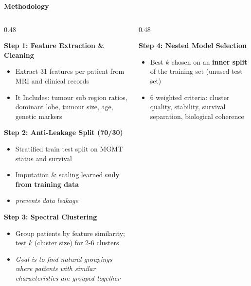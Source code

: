 \documentclass[aspectratio=169, 10pt]{beamer}
\begin{document}
\begin{frame}{\textbf{Methodology}}
\footnotesize

\begin{columns}[T]
\begin{column}{0.48\textwidth}

\textbf{Step 1: Feature Extraction \& Cleaning}
\begin{itemize}
    \item Extract 31 features per patient from MRI and clinical records
    \item It Includes: tumour sub region ratios, dominant lobe, tumour size, age, genetic markers
\end{itemize}
\vspace{0.1cm}

\textbf{Step 2: Anti-Leakage Split (70/30)}
\begin{itemize}
    \item Stratified train test split on MGMT status and survival
    \item Imputation \& scaling learned \textbf{only from training data}
    \item \textit{prevents data leakage}
\end{itemize}
\vspace{0.1cm}

\textbf{Step 3: Spectral Clustering}
\begin{itemize}
    \item Group patients by feature similarity; test $k$ (cluster size) for 2-6 clusters
    \item \textit{Goal is to find natural groupings where patients with similar characteristics are grouped together}
\end{itemize}

\end{column}
\begin{column}{0.48\textwidth}

\textbf{Step 4: Nested Model Selection}
\begin{itemize}
    \item Best $k$ chosen on an \textbf{inner split} of the training set (unused test set)
    \item 6 weighted criteria: cluster quality, stability, survival separation, biological coherence
\end{itemize}
\vspace{0.1cm}


\end{column}
\end{columns}
\end{frame}
\end{document}
